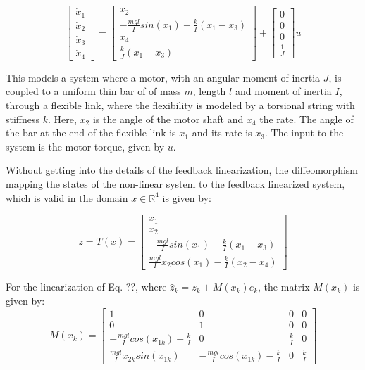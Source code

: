 \begin{equation}
\begin{bmatrix} \dot{x}_1 \\ \dot{x}_2 \\ \dot{x}_3 \\ \dot{x}_4    \end{bmatrix} = \begin{bmatrix} x_2 \\ -\frac{mgl}{I}sin(x_1) - \frac{k}{I}(x_1-x_3)  \\ x_4 \\ \frac{k}{J}(x_1-x_3)  \end{bmatrix} + \begin{bmatrix} 0 \\ 0 \\ 0 \\ \frac{1}{J} \end{bmatrix}u
\end{equation}

This models a system where a motor, with an angular moment of inertia $J$,  is coupled to a uniform thin bar of of mass $m$, length $l$ and moment of inertia $I$, through a flexible link, where the flexibility is modeled by a torsional string with stiffness $k$. Here, $x_2$ is the angle of the motor shaft and $x_4$ the rate. The angle of the bar at the end of the flexible link is $x_1$ and its rate  is $x_3$. The input to the system is the motor torque, given by $u$. 

Without getting into the details of the feedback linearization, the diffeomorphism mapping the states of the non-linear system to the feedback linearized system, which is valid in the domain $x \in \mathbb{R}^4$ is given by:

\begin{equation}
z = T(x) = \begin{bmatrix} x_1 \\ x_2 \\ -\frac{mgl}{I}sin(x_1) -\frac{k}{I}(x_1-x_3) \\ \frac{mgl}{I}x_2cos(x_1) - \frac{k}{I}(x_2-x_4)   \end{bmatrix}
\end{equation}

For the linearization of Eq. ??, where $\hat{z}_k = z_k + M(x_k)e_k$, the matrix $M(x_k)$ is given by:
\begin{equation}
M(x_k) = \begin{bmatrix} 1&0&0&0 \\ 0&1&0&0 \\ -\frac{mgl}{I} cos(x_{1k}) -\frac{k}{I} &0 &\frac{k}{I} &0 \\ \frac{mgl}{I}x_{2k}sin(x_{1k}) & -\frac{mgl}{I} cos(x_{1k}) - \frac{k}{I} & 0 & \frac{k}{I}     \end{bmatrix}
\end{equation}

